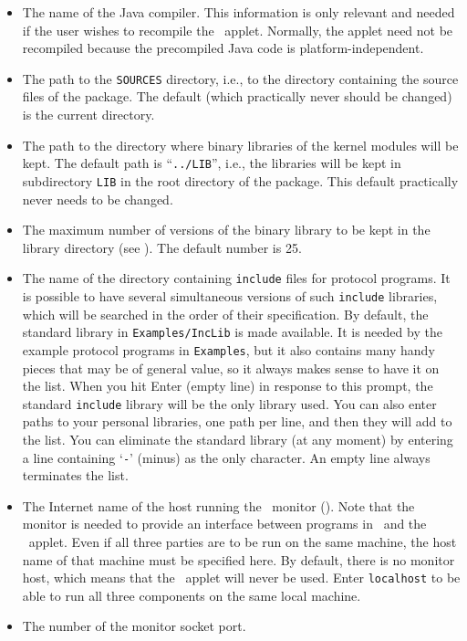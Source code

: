 \begin{itemize}
\item
The name of the Java compiler.
This information is only relevant and needed if the user
wishes to recompile the \dsd\ applet.
Normally, the applet need not be recompiled because the precompiled Java code
is platform-independent.
\item
The path to the {\tt SOURCES} directory, i.e., to the directory containing
the source files of the package.
The default (which practically never should be changed)
is the current directory.
\item
The path to the directory where binary libraries of the kernel modules
will be kept.
The default path is ``{\tt ../LIB}'', i.e., the libraries will be kept in
subdirectory {\tt LIB} in the root directory of the package.
This default practically never needs to be changed.
\item
The maximum number of versions of the binary library to be kept in the
library directory (see ).
The default number is 25.
\item
The name of the directory containing {\tt include} files for protocol programs.
It is possible to have several simultaneous versions of such {\tt include}
libraries, which will be searched in the order of their specification.
By default, the standard library in {\tt Examples/IncLib} is made available.
It is needed by the example protocol programs in {\tt Examples}, but it also
contains many handy pieces that may be of general value, so it always makes
sense to have it on the list.
When you hit Enter (empty line) in response to this prompt, the standard
{\tt include} library will be the only library used.
You can also enter paths to your personal libraries, one path per line, and
then they will add to the list.
You can eliminate the standard library (at any moment) by entering a line
containing `{\tt -}' (minus) as the only character.
An empty line always terminates the list.
\item
The Internet
name of the host running the \smurph\ monitor ().
Note that the monitor is needed to provide an interface between programs
in \smurph\ and the \dsd\ applet.
Even if all three parties are to be run on the same machine, the host name
of that machine must be specified here.
By default, there is no monitor host, which means that the \dsd\ applet
will never be used.
Enter {\tt localhost} to be able to
run all three components on the same local machine.
\item
The number of the monitor socket port.

\end{itemize}
